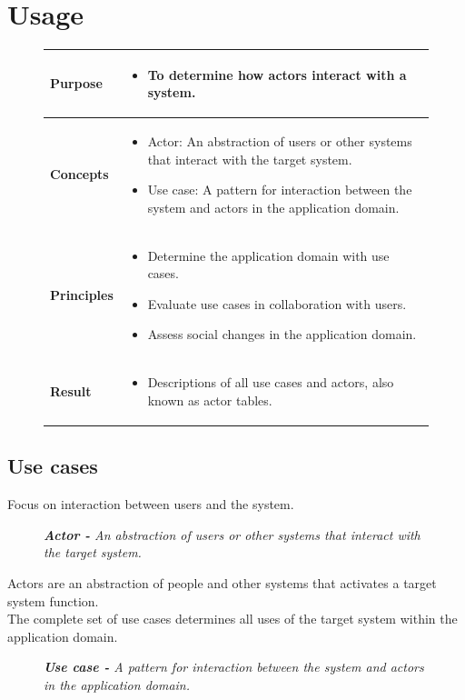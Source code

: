 \chapter{Usage \ooad[121]}
\begin{figure}[H]
    \begin{tabular}{|l|p{12cm}|}
        \hline
        \textbf{Purpose} & \begin{itemize}
            \item To determine how actors interact with a system.
        \end{itemize} \\\hline
        \textbf{Concepts} & \begin{itemize}
            \item Actor: An abstraction of users or other systems that interact with the target system.
            \item Use case: A pattern for interaction between the system and actors in the application domain.
        \end{itemize} \\\hline
        \textbf{Principles} & \begin{itemize}
            \item Determine the application domain with use cases.
            \item Evaluate use cases in collaboration with users.
            \item Assess social changes in the application domain.
        \end{itemize} \\\hline
        \textbf{Result} & \begin{itemize}
            \item Descriptions of all use cases and actors, also known as actor tables.
        \end{itemize} \\\hline
    \end{tabular}
\end{figure}

\section{Use cases}
Focus on interaction between users and the system.
\begin{figure}[H]
    \textit{\textbf{Actor -} An abstraction of users or other systems that interact with the target system.}
\end{figure}
Actors are an abstraction of people and other systems that activates a target system function.\\
The complete set of use cases determines all uses of the target system within the application domain.
\begin{figure}[H]
    \textit{\textbf{Use case -} A pattern for interaction between the system and actors in the application domain.}
\end{figure}

